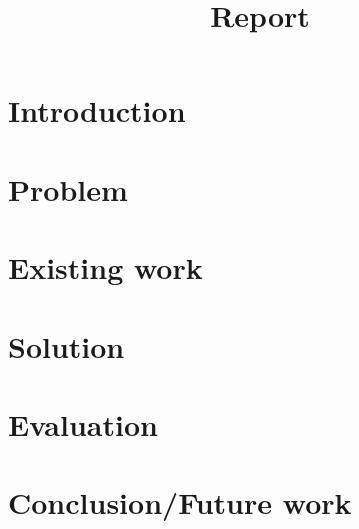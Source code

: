 \documentclass[11pt,a4paper]{article}
\title{Report}
\author{
}
\begin{document}
\maketitle
\section{Introduction} %
\label{sec:introduction}


\section{Problem} %
\label{sec:problem}


\section{Existing work} %
\label{sec:existing_work}

\section{Solution} %
\label{sec:solution}

\section{Evaluation} %
\label{sec:evaluation}

\section{Conclusion/Future work} %
\label{sec:conclusion_future_work}



\end{document}

